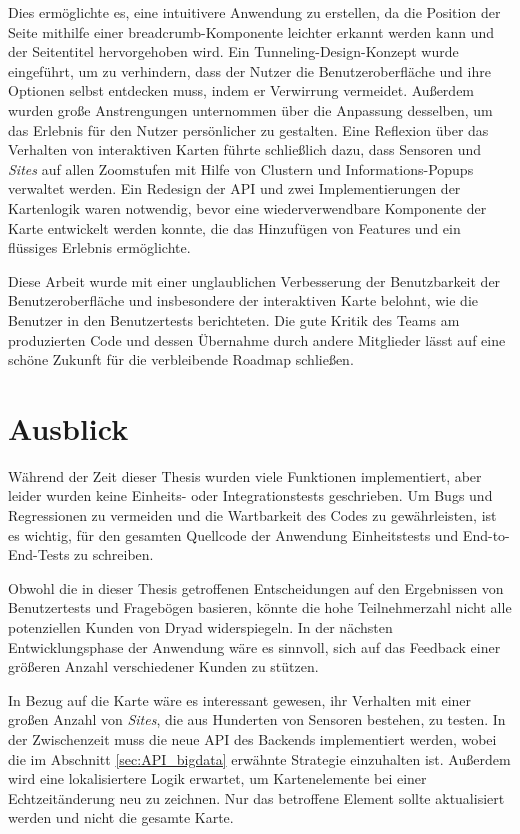 Dies ermöglichte es, eine intuitivere Anwendung zu erstellen, da die Position der Seite mithilfe einer breadcrumb-Komponente leichter erkannt werden kann und der Seitentitel hervorgehoben wird.
Ein Tunneling-Design-Konzept wurde eingeführt, um zu verhindern, dass der Nutzer die Benutzeroberfläche und ihre Optionen selbst entdecken muss, indem er Verwirrung vermeidet.
Außerdem wurden große Anstrengungen unternommen über die Anpassung desselben, um das Erlebnis für den Nutzer persönlicher zu gestalten.
Eine Reflexion über das Verhalten von interaktiven Karten führte schließlich dazu, dass Sensoren und \textit{Sites} auf allen Zoomstufen mit Hilfe von Clustern und Informations-Popups verwaltet werden.
Ein Redesign der API und zwei Implementierungen der Kartenlogik waren notwendig, bevor eine wiederverwendbare Komponente der Karte entwickelt werden konnte, die das Hinzufügen von Features und ein flüssiges Erlebnis ermöglichte.

Diese Arbeit wurde mit einer unglaublichen Verbesserung der Benutzbarkeit der Benutzeroberfläche und insbesondere der interaktiven Karte belohnt, wie die Benutzer in den Benutzertests berichteten.
Die gute Kritik des Teams am produzierten Code und dessen Übernahme durch andere Mitglieder lässt auf eine schöne Zukunft für die verbleibende Roadmap schließen.


\section{Ausblick}

Während der Zeit dieser Thesis wurden viele Funktionen implementiert, aber leider wurden keine Einheits- oder Integrationstests geschrieben.
Um Bugs und Regressionen zu vermeiden und die Wartbarkeit des Codes zu gewährleisten, ist es wichtig, für den gesamten Quellcode der Anwendung Einheitstests und End-to-End-Tests zu schreiben.

Obwohl die in dieser Thesis getroffenen Entscheidungen auf den Ergebnissen von Benutzertests und Fragebögen basieren, könnte die hohe Teilnehmerzahl nicht alle potenziellen Kunden von Dryad widerspiegeln.
In der nächsten Entwicklungsphase der Anwendung wäre es sinnvoll, sich auf das Feedback einer größeren Anzahl verschiedener Kunden zu stützen.

In Bezug auf die Karte wäre es interessant gewesen, ihr Verhalten mit einer großen Anzahl von \textit{Sites}, die aus Hunderten von Sensoren bestehen, zu testen.
In der Zwischenzeit muss die neue API des Backends implementiert werden, wobei die im Abschnitt \ref{sec:API_bigdata} erwähnte Strategie einzuhalten ist.
Außerdem wird eine lokalisiertere Logik erwartet, um Kartenelemente bei einer Echtzeitänderung neu zu zeichnen.
Nur das betroffene Element sollte aktualisiert werden und nicht die gesamte Karte.

